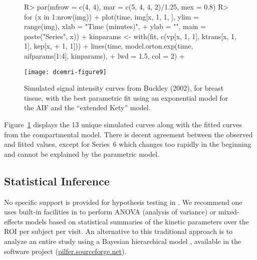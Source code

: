 \documentclass[article]{jss}
\begin{document}
\begin{Schunk}
\end{Schunk}
\begin{figure}[!htbp]
\begin{center}
\begin{Schunk}
\begin{Sinput}
R> par(mfrow = c(4, 4), mar = c(5, 4, 4, 2)/1.25, mex = 0.8)
R> for (x in 1:nrow(img)) {
+     plot(time, img[x, 1, 1, ], ylim = range(img), xlab = "Time (minutes)", 
+         ylab = "", main = paste("Series", x))
+     kinparams <- with(fit, c(vp[x, 1, 1], ktrans[x, 1, 1], kep[x, 
+         1, 1]))
+     lines(time, model.orton.exp(time, aifparams[1:4], kinparams), 
+         lwd = 1.5, col = 2)
+ }
\end{Sinput}
\end{Schunk}
\texttt{[image: dcemri-figure9]}
\end{center}
\caption{Simulated signal intensity curves from Buckley (2002), for
  breast tissue, with the best parametric fit using an exponential
  model for the AIF and the ``extended Kety'' model.}
\label{fig:fitted-kinetic}
\end{figure}

Figure~\ref{fig:fitted-kinetic} displays the 13 unique simulated
curves along with the fitted curves from the compartmental model.
There is decent agreement between the observed and fitted values,
except for Series~6 which changes too rapidly in the beginning and
cannot be explained by the parametric model.

\subsection[Statistical Inference]{Statistical Inference}

No specific support is provided for hypothesis testing in
.  We recommend one uses built-in facilities in
 to perform ANOVA (analysis of variance) or mixed-effects
models based on statistical summaries of the kinetic parameters over
the ROI per subject per visit.  An alternative to this traditional
approach is to analyze an entire study using a Bayesian hierarchical
model \citep{sch-etal:hierarchical}, available in the software project
 (\url{pilfer.sourceforge.net}).
\end{document}
